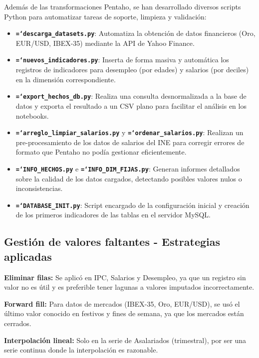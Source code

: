 \documentclass{article}
\let\oldtexttt\texttt  %
\renewcommand{\texttt}[1]{{\footnotesize\oldtexttt{\hyphenchar\font=`\-#1}}}  %
\begin{document}
Adem\'as de las transformaciones Pentaho, se han desarrollado diversos scripts Python para automatizar tareas de soporte, limpieza y validaci\'on:

\begin{itemize}
    \item \textbf{\texttt{descarga\_datasets.py}}: Automatiza la obtenci\'on de datos financieros (Oro, EUR/USD, IBEX-35) mediante la API de Yahoo Finance.
    \item \textbf{\texttt{nuevos\_indicadores.py}}: Inserta de forma masiva y autom\'atica los registros de indicadores para desempleo (por edades) y salarios (por deciles) en la dimensi\'on correspondiente.
    \item \textbf{\texttt{export\_hechos\_db.py}}: Realiza una consulta desnormalizada a la base de datos y exporta el resultado a un CSV plano para facilitar el an\'alisis en los notebooks.
    \item \textbf{\texttt{arreglo\_limpiar\_salarios.py}} y \textbf{\texttt{ordenar\_salarios.py}}: Realizan un pre-procesamiento de los datos de salarios del INE para corregir errores de formato que Pentaho no pod\'ia gestionar eficientemente.
    \item \textbf{\texttt{INFO\_HECHOS.py}} e \textbf{\texttt{INFO\_DIM\_FIJAS.py}}: Generan informes detallados sobre la calidad de los datos cargados, detectando posibles valores nulos o inconsistencias.
    \item \textbf{\texttt{DATABASE\_INIT.py}}: Script encargado de la configuraci\'on inicial y creaci\'on de los primeros indicadores de las tablas en el servidor MySQL.
\end{itemize}

\subsection{Gesti\'on de valores faltantes - Estrategias aplicadas}

\textbf{Eliminar filas:} Se aplic\'o en IPC, Salarios y Desempleo, ya que un registro sin valor no es \'util y es preferible tener lagunas a valores imputados incorrectamente.

\textbf{Forward fill:} Para datos de mercados (IBEX-35, Oro, EUR/USD), se us\'o el \'ultimo valor conocido en festivos y fines de semana, ya que los mercados est\'an cerrados.

\textbf{Interpolaci\'on lineal:} Solo en la serie de Asalariados (trimestral), por ser una serie continua donde la interpolaci\'on es razonable.
\end{document}
